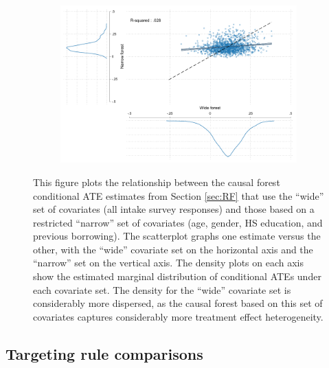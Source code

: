\begin{figure}[H]
    \caption{Conditional ATEs from ``wide'' and ``narrow'' covariate sets}
    \label{wide_narrow_forests}
    \vspace{-2em}
    \begin{center}
    \begin{subfigure}{0.65\textwidth}
        \centering
        \includegraphics[width=\textwidth]{Figuras/scatter_hist_wide_narrow.pdf}
    \end{subfigure}
    \end{center}
    \vspace{-1em}
      \scriptsize  This figure plots the relationship between the causal forest conditional ATE estimates from Section \ref{sec:RF} that use the ``wide'' set of covariates (all intake survey responses) and those based on a restricted ``narrow'' set of covariates (age, gender, HS education, and previous borrowing). The scatterplot graphs one estimate versus the other, with the ``wide'' covariate set on the horizontal axis and the ``narrow'' set on the vertical axis. The density plots on each axis show the estimated marginal distribution of conditional ATEs under each covariate set. The density for the ``wide'' covariate set is considerably more dispersed, as the causal forest based on this set of covariates captures considerably more treatment effect heterogeneity.

\end{figure}



\subsection{Targeting rule comparisons}

